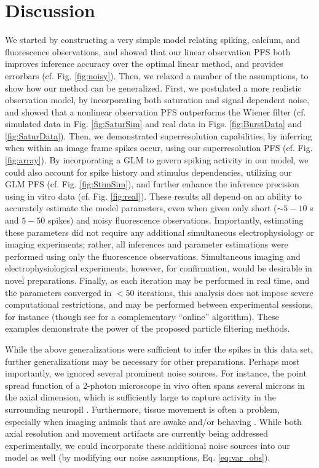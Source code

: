 \documentclass[10pt]{article}
\begin{document}
\section*{Discussion}

We started by constructing a very simple model relating spiking, calcium, and fluorescence observations, and showed that our linear observation PFS both improves inference accuracy over the optimal linear method, and provides errorbars (cf. Fig. \ref{fig:noisy}). Then, we relaxed a number of the assumptions, to show how our method can be generalized. First, we postulated a more realistic observation model, by incorporating both saturation and signal dependent noise, and showed that a nonlinear observation PFS outperforms the Wiener filter (cf. simulated data in Fig. \ref{fig:SaturSim} and real data in Figs. \ref{fig:BurstData} and \ref{fig:SaturData}). Then, we demonstrated superresolution capabilities, by inferring when within an image frame spikes occur, using our superresolution PFS (cf. Fig. \ref{fig:array}). By incorporating a GLM to govern spiking activity in our model, we could also account for spike history and stimulus dependencies, utilizing our GLM PFS (cf. Fig. \ref{fig:StimSim}), and further enhance the inference precision using in vitro data (cf. Fig. \ref{fig:real}). These results all depend on an ability to accurately estimate the model parameters, even when given only short ($\sim 5-10$ s and $5-50$ spikes) and noisy fluorescence observations.  Importantly, estimating these parameters did not require any additional simultaneous electrophysiology or imaging experiments; rather, all inferences and parameter estimations were performed using only the fluorescence observations.  Simultaneous imaging and electrophysiological experiments, however, for confirmation, would be desirable in novel preparations. Finally, as each iteration may be performed in real time, and the parameters converged in $<50$ iterations, this analysis does not impose severe computational restrictions, and may be performed between experimental sessions, for instance (though see \cite{VogelsteinPaninski09} for a complementary ``online'' algorithm). These examples demonstrate the power of the proposed particle filtering methods. 

While the above generalizations were sufficient to infer the spikes in this data set, further generalizations may be necessary for other preparations.  Perhaps most importantly, we ignored several prominent noise sources.  For instance, the point spread function of a 2-photon microscope in vivo often spans several microns in the axial dimension, which is sufficiently large to capture activity in the surrounding neuropil \cite{GobelHelmchen07}. Furthermore, tissue movement is often a problem, especially when imaging animals that are awake and/or behaving \cite{DombeckTank07}. While both axial resolution and movement artifacts are currently being addressed experimentally, we could incorporate these additional noise sources into our model as well (by modifying our noise assumptions, Eq. \ref{eq:var_obs}).
\end{document}
